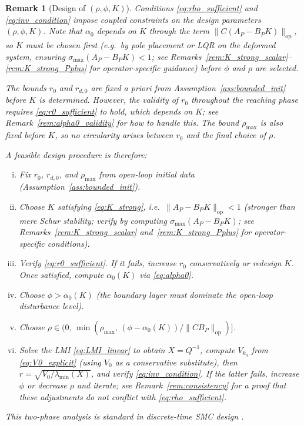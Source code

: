 \documentclass[10pt]{amsart}
\numberwithin{equation}{section}
\newtheorem{remark}[theorem]{Remark}
\begin{document}
\begin{remark}[Design of $(\rho,\phi,K)$]\label{rem:design}
Conditions \eqref{eq:rho_sufficient} and \eqref{eq:inv_condition} impose coupled
constraints on the design parameters $(\rho, \phi, K)$. Note that $\alpha_0$ depends on
$K$ through the term $\|C(A_P - B_P K)\|_{\mathrm{op}}$, so $K$ must be chosen first
(e.g.\ by pole placement or LQR on the deformed system, ensuring
$\sigma_{\max}(A_P - B_PK) < 1$; see
Remarks~\ref{rem:K_strong_scalar}--\ref{rem:K_strong_Pplus} for operator-specific
guidance) before $\phi$ and $\rho$ are selected.

The bounds $r_0$ and $r_{d,0}$ are fixed a priori from Assumption~\ref{ass:bounded_init}
before $K$ is determined. However, the validity of $r_0$ throughout the reaching phase
requires \eqref{eq:r0_sufficient} to hold, which depends on $K$; see
Remark~\ref{rem:alpha0_validity} for how to handle this. The bound $\rho_{\max}$ is
also fixed before $K$, so no circularity arises between $r_0$ and the final choice of
$\rho$.

\noindent\textit{A feasible design procedure} is therefore:
\begin{enumerate}[(i)]
  \item Fix $r_0$, $r_{d,0}$, and $\rho_{\max}$ from open-loop initial data
        (Assumption~\ref{ass:bounded_init}).
  \item Choose $K$ satisfying \eqref{eq:K_strong}, i.e.\
        $\|A_P - B_P K\|_{\mathrm{op}} < 1$ (stronger than mere Schur stability;
        verify by computing $\sigma_{\max}(A_P-B_PK)$; see
        Remarks~\ref{rem:K_strong_scalar} and~\ref{rem:K_strong_Pplus} for
        operator-specific conditions).
  \item Verify \eqref{eq:r0_sufficient}. If it fails, increase $r_0$ conservatively
        or redesign $K$. Once satisfied, compute $\alpha_0(K)$ via \eqref{eq:alpha0}.
  \item Choose $\phi > \alpha_0(K)$ (the boundary layer must dominate the open-loop
        disturbance level).
  \item Choose $\rho \in (0,\,\min(\rho_{\max},\,(\phi - \alpha_0(K))/\|CB_P\|_{\mathrm{op}})]$.
  \item Solve the LMI \eqref{eq:LMI_linear} to obtain $X = Q^{-1}$, compute $V_{k_0}$
        from \eqref{eq:V0_explicit} (using $V_0$ as a conservative substitute), then
        $r = \sqrt{V_0/\lambda_{\min}(X)}$, and verify \eqref{eq:inv_condition}. If
        the latter fails, increase $\phi$ or decrease $\rho$ and iterate; see
        Remark~\ref{rem:consistency} for a proof that these adjustments do not conflict
        with \eqref{eq:rho_sufficient}.
\end{enumerate}
This two-phase analysis is standard in discrete-time SMC design \cite{Edwards1998}.
\end{remark}
\end{document}
